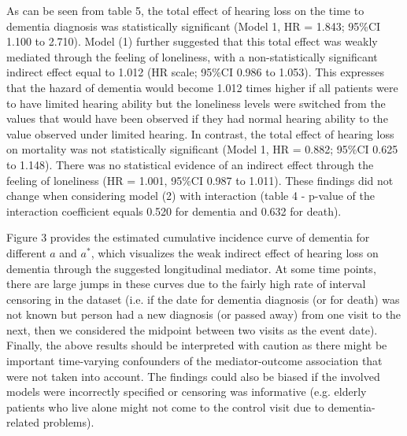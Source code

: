 \documentclass[AMA,STIX1COL]{WileyNJD-v2}
\begin{document}
As can be seen from table 5, the total effect of hearing loss on the time to dementia diagnosis was statistically significant (Model 1, HR = 1.843; 95\%CI 1.100 to 2.710).  Model (1) further suggested that this total effect was weakly mediated through the feeling of loneliness, with a non-statistically significant indirect effect equal to 1.012 (HR scale; 95\%CI 0.986 to 1.053). This expresses that the hazard of dementia would become 1.012 times higher if all patients were to have limited hearing ability but the loneliness levels were switched from the values that would have been observed if they had normal hearing ability to the value observed under limited hearing. In contrast, the total effect of hearing loss on mortality was not statistically significant  (Model 1, HR = 0.882; 95\%CI 0.625 to 1.148). There was no statistical evidence of an indirect effect through the feeling of loneliness (HR = 1.001, 95\%CI 0.987 to 1.011). These findings did not change when considering model (2) with interaction (table 4 - p-value of the interaction coefficient equals 0.520 for dementia and 0.632 for death).

Figure 3 provides the estimated cumulative incidence curve of dementia for different $a$ and $a^*$, which visualizes the weak indirect effect of hearing loss on dementia through the suggested longitudinal mediator. At some time points, there are large jumps in these curves due to the fairly high rate of interval censoring in the dataset (i.e. if the date for dementia diagnosis (or for death) was not known but person had a new diagnosis (or passed away) from one visit to the next, then we considered the midpoint between two visits as the event date). Finally, the above results should be interpreted with caution as there might be important time-varying confounders of the mediator-outcome association that were not taken into account. The findings could also be biased if the involved models were incorrectly specified or censoring was informative (e.g.  elderly patients who live alone might not come to the control visit due to dementia-related problems).
\end{document}
